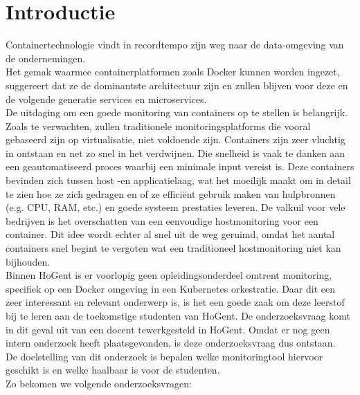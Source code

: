 
\section{Introductie} %
\label{sec:introductie}
Containertechnologie vindt in recordtempo zijn weg naar de data-omgeving van de ondernemingen.\autocite{Cole2016}
\\
Het gemak waarmee containerplatformen zoals Docker kunnen worden ingezet, suggereert dat ze de dominantste architectuur zijn en zullen blijven voor deze en de volgende generatie services en microservices.
\\
De uitdaging om een goede monitoring van containers op te stellen is belangrijk. Zoals te verwachten, zullen traditionele monitoringsplatforms die vooral gebaseerd zijn op virtualisatie, niet voldoende zijn. Containers zijn zeer vluchtig in ontstaan en net zo snel in het verdwijnen. Die snelheid is vaak te danken aan een geautomatiseerd proces waarbij een minimale input vereist is. Deze containers bevinden zich tussen host -en applicatielaag, wat het moeilijk maakt om in detail te zien hoe ze zich gedragen en of ze efficiënt gebruik maken van hulpbronnen (e.g. CPU, RAM, etc.) en goede systeem prestaties leveren. De valkuil voor vele bedrijven is het overschatten van een eenvoudige hostmonitoring voor een container. Dit idee wordt echter al snel uit de weg geruimd, omdat het aantal containers snel begint te vergoten wat een traditioneel hostmonitoring niet kan bijhouden.
\\
Binnen HoGent is er voorlopig geen opleidingsonderdeel omtrent monitoring, specifiek op een Docker omgeving in een Kubernetes orkestratie. Daar dit een zeer interessant en relevant onderwerp is, is het een goede zaak om deze leerstof bij te leren aan de toekomstige studenten van HoGent. De onderzoeksvraag komt in dit geval uit van een docent tewerkgesteld in HoGent. Omdat er nog geen intern onderzoek heeft plaatsgevonden, is deze onderzoeksvraag dus ontstaan. 
\\
De doelstelling van dit onderzoek is bepalen welke monitoringtool hiervoor geschikt is en welke haalbaar is voor de studenten. 
\\
Zo bekomen we volgende onderzoeksvragen:

